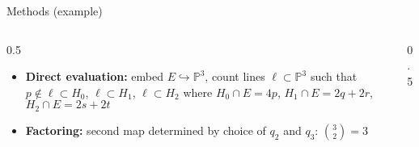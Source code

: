 \documentclass{beamer}
\renewcommand{\P}{\mathbb P}
\theoremstyle{definition}
\begin{document}
                                                                                                                                                                                                                          \begin{frame}{Methods (example)}
      \begin{columns}[c]
        \begin{column}{0.5\hsize}
                                                                                                                                                                                                                            \begin{itemize}
                                                                                                                                                                                                                            \item {\bf Direct evaluation:} embed $E\hookrightarrow\P^3$, count lines $\ell\subset\P^3$
                                                                                                                                                                                                                              such that $p\notin\ell\subset H_0$, $\ell\subset H_1$, $\ell\subset H_2$ where $H_0\cap E=4p$, $H_1\cap E=2q+2r$, $H_2\cap E=2s+2t$
                                                                                                                                                                                                                            \item {\bf Factoring:} second map determined by choice
                                                                                                                                                                                                                              of $q_2$ and $q_3$: $\binom 32=3$
                                                                                                                                                                                                                            \end{itemize}
        \end{column}
        \begin{column}{0.5\hsize}


\end{column}
\end{columns}
\end{frame}
\end{document}
